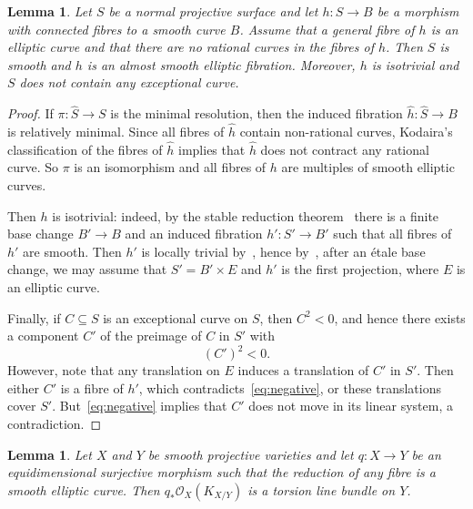 \documentclass[11pt]{article}
\newtheorem{lemm}[theo]{Lemma}
\theoremstyle{definition}
\numberwithin{equation}{section}
\numberwithin{figure}{section}
\numberwithin{table}{section}
\newcommand{\OO}{\mathcal{O}}
\begin{document}
\begin{lemm}\label{lem:surface}
Let $S$ be a normal projective surface and let $h\colon S \to B$ be a morphism with connected fibres to a smooth curve $B$. Assume that a general fibre of $h$ is an elliptic curve and that there are no rational curves in the fibres of $h$. Then $S$ is smooth and $h$ is an almost smooth elliptic fibration. Moreover, $h$ is isotrivial and $S$ does not contain any exceptional curve.
\end{lemm}

\begin{proof}
If $\pi\colon \widehat S \to S$ is the minimal resolution, then the induced fibration $\widehat h\colon \widehat S \to B$ is relatively minimal. Since all fibres of $\widehat h$ contain non-rational curves, Kodaira's classification of the fibres of $\widehat h$ implies that $\widehat h$ does not contract any rational curve. So $\pi$ is an isomorphism and all fibres of $h$ are multiples of smooth elliptic curves.

Then $h$ is isotrivial: indeed, by the stable reduction theorem~\cite{KKMS} there is a finite base change $B'\to B$ and an induced fibration $h'\colon S'\to B'$ such that all fibres of $h'$ are smooth. Then $h'$ is locally trivial by~\cite[Theorems~III.17.3 and III.18.2]{BHPV04}, hence by~\cite[Proposition~VI.8]{Bea96}, after an étale base change, we may assume that $S'=B'\times E$ and $h'$ is the first projection, where $E$ is an elliptic curve.

Finally, if $C\subseteq S$ is an exceptional curve on $S$, then $C^2<0$, and hence there exists a component $C'$ of the preimage of $C$ in $S'$ with
\begin{equation}\label{eq:negative}
(C')^2<0.
\end{equation}
However, note that any translation on $E$ induces a translation of $C'$ in $S'$. Then either $C'$ is a fibre of $h'$, which contradicts~\eqref{eq:negative}, or these translations cover $S'$. But~\eqref{eq:negative} implies that $C'$ does not move in its linear system, a contradiction.
\end{proof}


\begin{lemm}\label{lem:flat-elliptic-a}
Let $X$ and $Y$ be smooth projective varieties and let $q\colon X \to Y$ be an equidimensional surjective morphism such that the reduction of any fibre is a smooth elliptic curve. Then $q_*\OO_X(K_{X/Y})$ is a torsion line bundle on $Y$.
\end{lemm}
\end{document}
